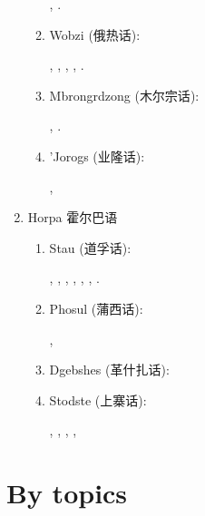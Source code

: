 \documentclass[oldfontcommands,oneside,a4paper,11pt]{article}
\newcommand{\zh}[1]{{\cn #1}}
\newcommand{\langue}[2]{#1}
\begin{document}
\begin{enumerate}
\begin{enumerate}
\citet{huangbf03lavrung}, \citet{huangbf07lavrung}.

\item Wobzi (\zh{俄热话}): 

\citet{linxr93jiarong}, \citet{lai13fuyin}, \citet{lai13affixale}, \citet{lai14caus}, \citet{lai15person}.
\item Mbrongrdzong (\zh{木尔宗话}): 

\citet{jackson00sidaba}, \citet{jackson05yingao}.
\item 'Jorogs (\zh{业隆话}):  

\citet{yin07yelong}, 
\end{enumerate}
\item \langue{Horpa \zh{霍尔巴语}}{Horpa \zh{霍尔巴语}}
\begin{enumerate} 
\item Stau (\zh{道孚话}): 

\citet{hodgson57sifan}, \citet{wang70stau}, \citet{sun83liujiang},  \citet{huangbf91daofu}, \citet{sun13gexi}, \citet{antonov14rtau}, \citet{jacques14rtau}.
\item Phosul (\zh{蒲西话}): 

\citet{jackson00puxi}, \citet{jackson15puxi}
\item Dgebshes (\zh{革什扎话}): 

\citet{duoerji98geshizha}
\item Stodste (\zh{上寨话}): 

\citet{jackson00sidaba}, \citet{qu07shangzhai}, \citet{jackson07shangzhai}, \citet{sun15cigan}, \citet{sun16dongma}
\end{enumerate}
\end{enumerate}

\section{\langue{By topics}{Publications classées par sujet étudié}}



\end{document}
